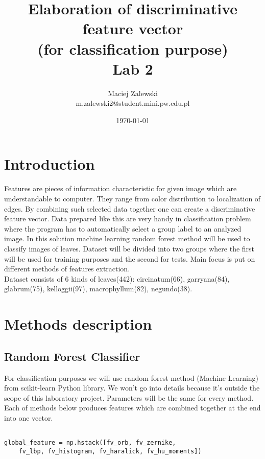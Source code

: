\documentclass{article}
\title{Elaboration of discriminative feature vector\\ (for classification purpose) \\ Lab 2} %
\author{Maciej Zalewski \\ m.zalewski2@student.mini.pw.edu.pl} %
\date{\today} %
\begin{document}
	
\maketitle %

\tableofcontents
\pagebreak

\section{Introduction}

Features are pieces of information characteristic for given image which are understandable to computer. They range from color distribution to localization of edges. By combining such selected data together one can create a discriminative feature vector. Data prepared like this are very handy in classification problem where the program has to automatically select a group label to an analyzed image. In this solution machine learning random forest method will be used to classify images of leaves. Dataset will be divided into two groups where the first will be used for training purposes and the second for tests. Main focus is put on different methods of features extraction.\\
Dataset consists of 6 kinds of leaves(442): circinatum(66), garryana(84), glabrum(75), kelloggii(97), macrophyllum(82), negundo(38).


\section{Methods description}

\subsection{Random Forest Classifier}

For classification purposes we will use random forest method (Machine Learning) from scikit-learn Python library. We won't go into details because it's outside the scope of this laboratory project. Parameters will be the same for every method. \\ 
Each of methods below produces features which are combined together at the end into one vector.

\begin{verbatim}

global_feature = np.hstack([fv_orb, fv_zernike, 
	fv_lbp, fv_histogram, fv_haralick, fv_hu_moments])

\end{verbatim}
\end{document}

